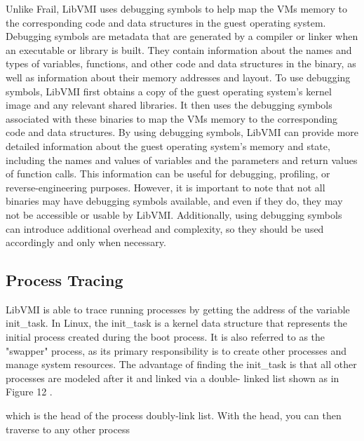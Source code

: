 \documentclass{report}
\begin{document}
\begin{spacing}{1.5}
{\large
\noindent Unlike Frail, LibVMI uses debugging symbols to help map the VMs memory to the corresponding code and data structures in the guest operating system. Debugging symbols are metadata that are generated by a compiler or linker when an executable or library is built. They contain information about the names and types of variables, functions, and other code and data structures in the binary, as well as information about their memory addresses and layout. To use debugging symbols, LibVMI first obtains a copy of the guest operating system's kernel image and any relevant shared libraries. It then uses the debugging symbols associated with these binaries to map the VMs memory to the corresponding code and data structures. By using debugging symbols, LibVMI can provide more detailed information about the guest operating system's memory and state, including the names and values of variables and the parameters and return values of function calls. This information can be useful for debugging, profiling, or reverse-engineering purposes. However, it is important to note that not all binaries may have debugging symbols available, and even if they do, they may not be accessible or usable by LibVMI. Additionally, using debugging symbols can introduce additional overhead and complexity, so they should be used accordingly and only when necessary.
\newline
}


\subsection{Process Tracing}

{\large
LibVMI is able to trace running processes by getting the address of the variable init_task. In Linux, the init\_task is a kernel data structure that represents the initial process created during the boot process. It is also referred to as the "swapper" process, as its primary responsibility is to create other processes and manage system resources. The advantage of finding the init_task is that all
other processes are modeled after it and linked via a double- linked list shown as in Figure 12 \cite{xiong2012libvmi}. 





which is the head of the process doubly-link list. With the head, you can then traverse to any other process 
\newline
}







\end{spacing}
\end{document}
